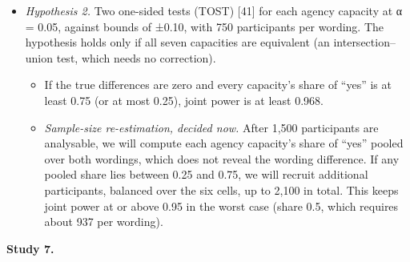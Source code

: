 \documentclass[
  11pt,
]{article}
\providecommand{\tightlist}{%
  \setlength{\itemsep}{0pt}\setlength{\parskip}{0pt}}
\begin{document}
\begin{itemize}
  \begin{itemize}
  \tightlist
  \item
    Smallest effect of interest: d = 0.25 {[}41{]}. If the standard
    deviation of the score is near 0.25, this is a change of about half
    of one of the seven answers per person.
  \item
    We have no human pilot data for this measure. Published effects of
    how AI systems are presented on people's judgements of them {[}34{]}
    come from different measures and are likely to be inflated {[}42{]},
    so we do not base the plan on them.
  \item
    With 500 per condition, power is 0.957 for the difference test at d
    = 0.25, and 0.954 for the equivalence test against ±0.25 when the
    true effect is zero (\texttt{src/rr\_power.py};
    \texttt{results/rr\_power.txt}).
  \end{itemize}
\item
  \emph{Hypothesis 2.} Two one-sided tests (TOST) {[}41{]} for each
  agency capacity at α = 0.05, against bounds of ±0.10, with 750
  participants per wording. The hypothesis holds only if all seven
  capacities are equivalent (an intersection--union test, which needs no
  correction).

  \begin{itemize}
  \tightlist
  \item
    If the true differences are zero and every capacity's share of
    ``yes'' is at least 0.75 (or at most 0.25), joint power is at least
    0.968.
  \item
    \emph{Sample-size re-estimation, decided now.} After 1,500
    participants are analysable, we will compute each agency capacity's
    share of ``yes'' pooled over both wordings, which does not reveal
    the wording difference. If any pooled share lies between 0.25 and
    0.75, we will recruit additional participants, balanced over the six
    cells, up to 2,100 in total. This keeps joint power at or above 0.95
    in the worst case (share 0.5, which requires about 937 per wording).
  \end{itemize}
\end{itemize}

\textbf{Study 7.}
\end{document}
